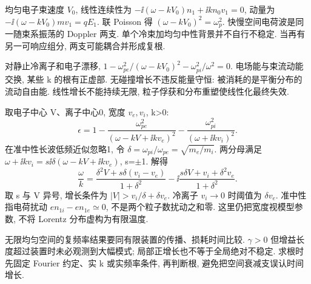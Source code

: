\label{ch:instability}
均匀电子束速度 $V_0$, 线性连续性为 $-\ii(\omega-kV_0)n_1+\ii kn_0v_1=0$, 动量为 $-\ii(\omega-kV_0)mv_1=qE_1$. 联 Poisson 得 $(\omega-kV_0)^2=\omega_p^2$. 快慢空间电荷波是同一随束系振荡的 Doppler 两支. 单个冷束加均匀中性背景并不自行不稳定. 当再有另一可响应组分, 两支可能耦合并形成复根.

对静止冷离子和电子漂移, $1-\omega_{pe}^2/(\omega-kV_0)^2-\omega_{pi}^2/\omega^2=0$. 电场能与束流动能交换, 某些 k 的根有正虚部. 无碰撞增长不违反能量守恒: 被消耗的是平衡分布的流动自由能. 线性增长不能持续无限, 粒子俘获和分布重塑使线性化最终失效.

取电子中心 V、离子中心0, 宽度 $v_e,v_i$, k>0:
\begin{equation}
 \epsilon=1-\frac{\omega_{pe}^2}{(\omega-kV+\ii kv_e)^2}
 -\frac{\omega_{pi}^2}{(\omega+\ii kv_i)^2}.
\end{equation}
在准中性长波低频近似忽略1, 令 $\delta=\omega_{pi}/\omega_{pe}=\sqrt{m_e/m_i}$. 两分母满足 $\omega+\ii kv_i=s\ii\delta(\omega-kV+\ii kv_e)$, s=\ensuremath{\pm}1. 解得
\begin{equation}
 \frac\omega k=\frac{\delta^2V+s\delta(v_i-v_e)}{1+\delta^2}
 -\ii\frac{s\delta V+v_i+\delta^2v_e}{1+\delta^2}.
\end{equation}
取 s 与 V 异号, 增长条件为 $|V|>v_i/\delta+\delta v_e$. 冷离子 $v_i\to0$ 时阈值为 $\delta v_e$. 准中性指电荷扰动 $en_{1i}-en_{1e}\simeq0$, 不是两个粒子数扰动之和零. 这里仍把宽度视模型参数, 不将 Lorentz 分布虚构为有限温度.

无限均匀空间的复频率结果要同有限装置的传播、损耗时间比较. $\gamma>0$ 但增益长度超过装置时未必观测到大幅模式; 局部正增长也不等于全局绝对不稳定. 求根时先固定 Fourier 约定、实 k 或实频率条件, 再判断根, 避免把空间衰减支误认时间增长.
